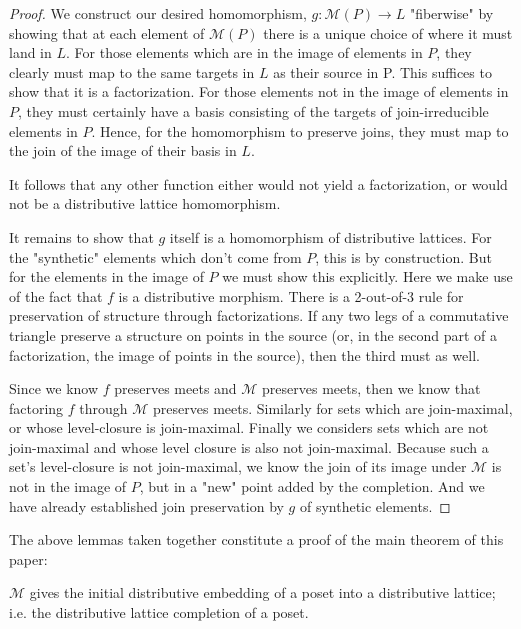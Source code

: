 \documentclass[hoptionsi,review,format=sigplan]{acmart}
\theoremstyle{definition}
\newcommand{\Mcc}{\mathcal{M}}
\begin{document}
\begin{proof}
We construct our desired homomorphism, \(g : \Mcc(P) \rightarrow L\) "fiberwise" by showing that at each element of \(\Mcc(P)\) there is a unique choice of where it must land in \(L\). For those elements which are in the image of elements in \(P\), they clearly must map to the same targets in \(L\) as their source in P. This suffices to show that it is a factorization. For those elements not in the image of elements in \(P\), they must certainly have a basis consisting of the targets of join-irreducible elements in \(P\). Hence, for the homomorphism to preserve joins, they must map to the join of the image of their basis in \(L\).

It follows that any other function either would not yield a factorization, or would not be a distributive lattice homomorphism.

It remains to show that \(g\) itself is a homomorphism of distributive lattices. For the "synthetic" elements which don't come from \(P\), this is by construction. But for the elements in the image of \(P\) we must show this explicitly. Here we make use of the fact that \(f\) is a distributive morphism. There is a 2-out-of-3 rule for preservation of structure through factorizations. If any two legs of a commutative triangle preserve a structure on points in the source (or, in the second part of a factorization, the image of points in the source), then the third must as well.

Since we know \(f\) preserves meets and \(\Mcc\) preserves meets, then we know that factoring \(f\) through \(\Mcc\) preserves meets. Similarly for sets which are join-maximal, or whose level-closure is join-maximal. Finally we considers sets which are not join-maximal and whose level closure is also not join-maximal. Because such a set's level-closure is not join-maximal, we know the join of its image under \(\Mcc\) is not in the image of \(P\), but in a "new" point added by the completion. And we have already established join preservation by \(g\) of synthetic elements.
\end{proof}

The above lemmas taken together constitute a proof of the main theorem of this paper:
\begin{theorem}

\(\Mcc\) gives the initial distributive embedding of a poset into a distributive lattice; i.e. the distributive lattice completion of a poset.
\end{theorem}
\end{document}
